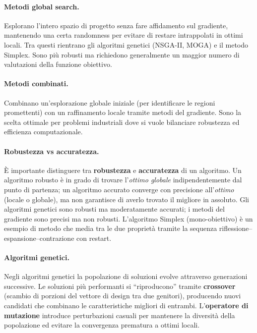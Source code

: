 \paragraph{Metodi global search.}
Esplorano l'intero spazio di progetto senza fare affidamento sul
gradiente, mantenendo una certa randomness per evitare di restare
intrappolati in ottimi locali.
Tra questi rientrano gli algoritmi genetici (NSGA-II, MOGA) e il
metodo Simplex.
Sono più robusti ma richiedono generalmente un maggior numero di
valutazioni della funzione obiettivo.

\paragraph{Metodi combinati.}
Combinano un'esplorazione globale iniziale (per identificare le regioni
promettenti) con un raffinamento locale tramite metodi del gradiente.
Sono la scelta ottimale per problemi industriali dove si vuole bilanciare
robustezza ed efficienza computazionale.

\paragraph{Robustezza vs accuratezza.}
È importante distinguere tra \textbf{robustezza} e \textbf{accuratezza}
di un algoritmo.
Un algoritmo robusto è in grado di trovare l'\textit{ottimo globale}
indipendentemente dal punto di partenza; un algoritmo accurato converge
con precisione all'\textit{ottimo} (locale o globale), ma non garantisce
di averlo trovato il migliore in assoluto.
Gli algoritmi genetici sono robusti ma moderatamente accurati; i metodi
del gradiente sono precisi ma non robusti.
L'algoritmo Simplex (mono-obiettivo) è un esempio di metodo che media
tra le due proprietà tramite la sequenza riflessione--espansione--contrazione
con restart.

\paragraph{Algoritmi genetici.}
Negli algoritmi genetici la popolazione di soluzioni evolve attraverso
generazioni successive.
Le soluzioni più performanti si ``riproducono'' tramite \textbf{crossover}
(scambio di porzioni del vettore di design tra due genitori), producendo
nuovi candidati che combinano le caratteristiche migliori di entrambi.
L'\textbf{operatore di mutazione} introduce perturbazioni casuali per
mantenere la diversità della popolazione ed evitare la convergenza
prematura a ottimi locali.

